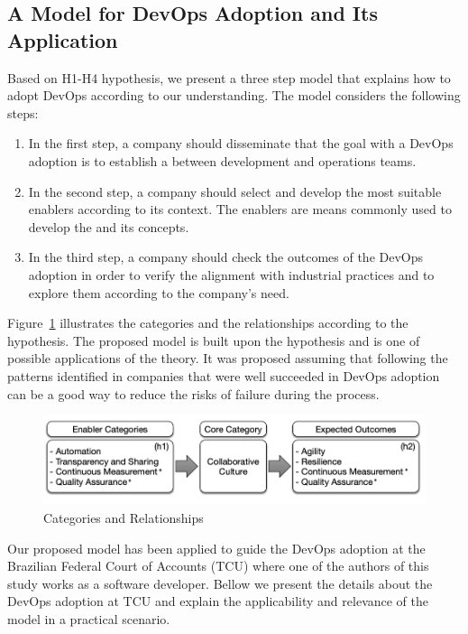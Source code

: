 \subsection{A Model for DevOps Adoption and Its Application}\label{sec:case_study}

Based on H1-H4 hypothesis, we present a three step model that
explains how to adopt DevOps according to our understanding. The
model considers the following steps:

\begin{enumerate}
\item In the first step, a company should
disseminate that the goal with a DevOps adoption is to
establish a \cc between
development and operations teams.

\item In the second step, a company should select and develop
the most suitable enablers according to its context. The enablers
are means commonly used to develop the \cc
and its concepts.

\item In the third step, a company should check the outcomes of the
DevOps adoption in order to verify the alignment with
industrial practices and to explore them according to the company's need.
\end{enumerate}

Figure~\ref{model} illustrates the categories and the
relationships according to the hypothesis. The proposed model is built upon
the hypothesis and is one of possible applications of the theory. It was proposed
assuming that following the patterns identified in companies that were
well succeeded in DevOps adoption can be a good way to reduce the risks of
failure during the process.

\begin{figure}
  \centering
  \includegraphics[width=.75\textwidth]{model.png}
  \caption{Categories and Relationships}
  \label{model}
\end{figure}


Our proposed model has been applied to guide the DevOps adoption at the
Brazilian Federal Court of Accounts (TCU) where one of the authors of this study
works as a software developer. Bellow we present the details about the DevOps
adoption at TCU and explain the applicability and relevance of the model in a
practical scenario.
